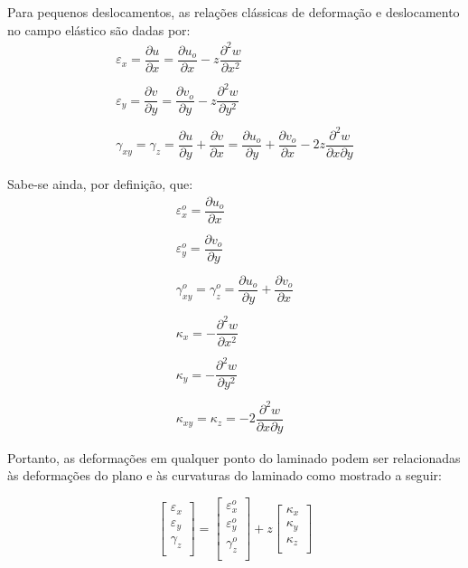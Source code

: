 Para pequenos deslocamentos, as relações clássicas de deformação e deslocamento no campo elástico são dadas por:
\begin{equation} \label{Strain_Displacement}
\begin{gathered}
\varepsilon_{x} = \dfrac{\partial u}{\partial x} = \dfrac{\partial u_o}{\partial x} - z\dfrac{\partial^2 w}{\partial x^2}\\~\\
\varepsilon_{y} = \dfrac{\partial v}{\partial y} = \dfrac{\partial v_o}{\partial y} - z\dfrac{\partial^2 w}{\partial y^2}\\~\\
\gamma_{xy} = \gamma_z = \dfrac{\partial u}{\partial y} + \dfrac{\partial v}{\partial x} = \dfrac{\partial u_o}{\partial y} + \dfrac{\partial v_o}{\partial x} - 2z\dfrac{\partial^2 w}{\partial x\partial y}
\end{gathered}
\end{equation}

Sabe-se ainda, por definição, que:
\begin{equation} \label{Strain_Curvatures}
\begin{gathered}
\varepsilon^o_{x} = \dfrac{\partial u_o}{\partial x}\\~\\
\varepsilon^o_{y} = \dfrac{\partial v_o}{\partial y}\\~\\
\gamma^o_{xy} = \gamma^o_z= \dfrac{\partial u_o}{\partial y} + \dfrac{\partial v_o}{\partial x}\\~\\
\kappa_x = -\dfrac{\partial^2 w}{\partial x^2}\\~\\
\kappa_y = -\dfrac{\partial^2 w}{\partial y^2}\\~\\
\kappa_{xy} = \kappa_z = -2\dfrac{\partial^2 w}{\partial x\partial y}
\end{gathered}
\end{equation}

Portanto, as deformações em qualquer ponto do laminado podem ser relacionadas às deformações do plano e às curvaturas do laminado como mostrado a seguir:

\begin{equation} \label{matrix_strain}
\begin{bmatrix}
    \varepsilon_{x} \\
    \varepsilon_{y} \\
    \gamma_{z} \\
\end{bmatrix}
=
\begin{bmatrix}
		\varepsilon^o_{x} \\
		\varepsilon^o_{y} \\
		\gamma^o_{z} \\
\end{bmatrix}
+z
\begin{bmatrix}
    \kappa_{x} \\
    \kappa_{y} \\
    \kappa_{z} \\
\end{bmatrix}
\end{equation}


